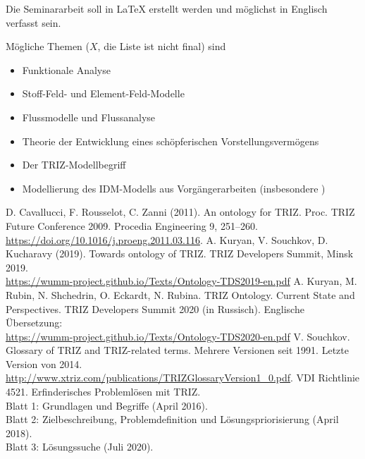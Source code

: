 \documentclass[11pt,a4paper]{article}
\begin{document}
Die Seminararbeit soll in {\LaTeX} erstellt werden und möglichst in Englisch
verfasst sein.

Mögliche Themen ($X$, die Liste ist nicht final) sind
\begin{itemize}[noitemsep]
\item Funktionale Analyse
\item Stoff-Feld- und Element-Feld-Modelle
\item Flussmodelle und Flussanalyse
\item Theorie der Entwicklung eines schöpferischen Vorstellungsvermögens
\item Der TRIZ-Modellbegriff
\item Modellierung des IDM-Modells aus Vorgängerarbeiten (insbesondere
  \cite{IDM2011})
\end{itemize}

\begin{thebibliography}{xxx}
 D. Cavallucci, F. Rousselot, C. Zanni (2011). An ontology
  for TRIZ. Proc. TRIZ Future Conference 2009. Procedia Engineering 9,
  251–260.  \url{https://doi.org/10.1016/j.proeng.2011.03.116}.
 A. Kuryan, V. Souchkov, D. Kucharavy (2019). Towards
  ontology of TRIZ. TRIZ Developers Summit, Minsk 2019.
  \\ \url{https://wumm-project.github.io/Texts/Ontology-TDS2019-en.pdf}
 A. Kuryan, M. Rubin, N. Shchedrin, O. Eckardt, N. Rubina.
  TRIZ Ontology. Current State and Perspectives. TRIZ Developers Summit 2020
  (in Russisch). Englische Übersetzung:
  \\ \url{https://wumm-project.github.io/Texts/Ontology-TDS2020-en.pdf}
 V. Souchkov. Glossary of TRIZ and TRIZ-related terms. Mehrere
  Versionen seit 1991. Letzte Version von 2014.
  \\ \url{http://www.xtriz.com/publications/TRIZGlossaryVersion1_0.pdf}.
 VDI Richtlinie 4521. Erfinderisches Problemlösen mit TRIZ.\\
  Blatt 1: Grundlagen und Begriffe (April 2016).\\ Blatt 2: Zielbeschreibung,
  Problemdefinition und Lösungspriorisierung (April 2018).\\ Blatt 3:
  Lösungssuche (Juli 2020). 
\end{thebibliography}
\end{document}
